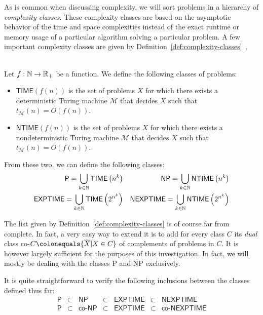 As is common when discussing complexity, we will sort problems in a hierarchy of \emph{complexity classes}. These complexity classes are based on the asymptotic behavior of the time and space complexities instead of the exact runtime or memory usage of a particular algorithm solving a particular problem. A few important complexity classes are given by Definition~\ref{def:complexity-classes}~\cite{complexity-modern}.

\begin{definition}\ \\
    \label{def:complexity-classes}
    Let \(f: \mathbb{N} \rightarrow \mathbb{R}_+\) be a function. We define the following classes of problems:
    \begin{itemize}
        \item \(\textsf{TIME}(f(n))\) is the set of problems \(X\) for which there exists a deterministic Turing machine \(\mathcal{M}\) that decides \(X\) such that \(t_{\mathcal{M}}(n) = O(f(n))\).
        \item 
        \(\textsf{NTIME}(f(n))\) is the set of problems \(X\) for which there exists a nondeterministic Turing machine \(\mathcal{M}\) that decides \(X\) such that \(t_{\mathcal{M}}(n) = O(f(n))\).    
    \end{itemize}
    From these two, we can define the following classes:
    \begin{align*}
        \textsf{P} = \bigcup\limits_{k\in\mathbb{N}} \textsf{TIME}\left(n^k\right)& &
        \textsf{NP} = \bigcup\limits_{k\in\mathbb{N}} \textsf{NTIME}\left(n^k\right) \\
        \textsf{EXPTIME} = \bigcup\limits_{k\in\mathbb{N}} \textsf{TIME}\left(2^{n^k}\right) & &
        \textsf{NEXPTIME} = \bigcup\limits_{k\in\mathbb{N}} \textsf{NTIME}\left(2^{n^k}\right) \\
    \end{align*}
\end{definition}

The list given by Definition~\ref{def:complexity-classes} is of course far from complete. In fact, a very easy way to extend it is to add for every class \(C\) its \emph{dual} class co-\({C} \colonequals \{\overline{X}| X\in C\}\) of complements of problems in \(C\).
It is however largely sufficient for the purposes of this investigation. In fact, we will mostly be dealing with the classes \textsf{P} and \textsf{NP} exclusively.

It is quite straightforward to verify the following inclusions between the classes defined thus far:
\[
    \begin{array}{ccccccc}        
        \textsf{P} &\subset& \textsf{NP} &\subset& \textsf{EXPTIME} &\subset& \textsf{NEXPTIME} \\
        \textsf{P} &\subset& \textsf{co-NP} &\subset& \textsf{EXPTIME} &\subset& \textsf{co-NEXPTIME}
    \end{array}
\]

